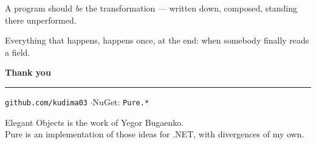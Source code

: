 \documentclass[aspectratio=169,10pt,t]{beamer}
\begin{document}
\begin{frame}[plain]
  \vfill
  \begin{minipage}{0.86\textwidth}
    {\Large A program should \emph{be} the transformation --- written down,
     composed, standing there unperformed.\par}
    \slidegap
    {\color{muted}Everything that happens, happens once, at the end: when
     somebody finally reads a field.\par}
  \end{minipage}
  \vfill
\end{frame}

\begin{frame}[plain]
  \vfill
  {\huge\bfseries Thank you\par}
  \vspace{1.2em}
  {\color{hairline}\rule{0.28\textwidth}{0.8pt}\par}
  \vspace{1.2em}
  {\large \texttt{github.com/kudima03} \quad$\cdot$\quad NuGet:
   \texttt{Pure.*}\par}
  \vspace{1.8em}
  {\color{muted}\small Elegant Objects is the work of Yegor Bugaenko.\\
   Pure is an implementation of those ideas for .NET, with divergences of my
   own.\par}
  \vfill
\end{frame}
\end{document}
